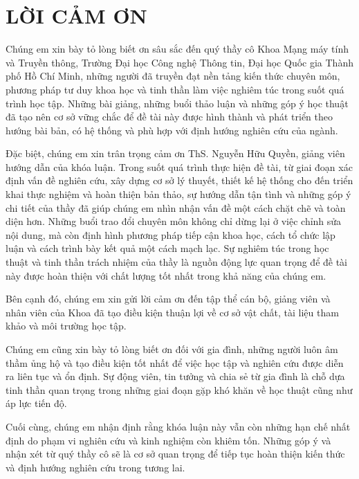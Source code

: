 \documentclass[12pt, oneside]{thesis}
\begin{document}
\frontmatter\pagestyle{plain}





\chapter*{LỜI CẢM ƠN}

Chúng em xin bày tỏ lòng biết ơn sâu sắc đến quý thầy cô Khoa Mạng máy tính và Truyền thông, Trường Đại học Công nghệ Thông tin, Đại học Quốc gia Thành phố Hồ Chí Minh, những người đã truyền đạt nền tảng kiến thức chuyên môn, phương pháp tư duy khoa học và tinh thần làm việc nghiêm túc trong suốt quá trình học tập. Những bài giảng, những buổi thảo luận và những góp ý học thuật đã tạo nên cơ sở vững chắc để đề tài này được hình thành và phát triển theo hướng bài bản, có hệ thống và phù hợp với định hướng nghiên cứu của ngành.

Đặc biệt, chúng em xin trân trọng cảm ơn ThS. Nguyễn Hữu Quyền, giảng viên hướng dẫn của khóa luận. Trong suốt quá trình thực hiện đề tài, từ giai đoạn xác định vấn đề nghiên cứu, xây dựng cơ sở lý thuyết, thiết kế hệ thống cho đến triển khai thực nghiệm và hoàn thiện bản thảo, sự hướng dẫn tận tình và những góp ý chi tiết của thầy đã giúp chúng em nhìn nhận vấn đề một cách chặt chẽ và toàn diện hơn. Những buổi trao đổi chuyên môn không chỉ dừng lại ở việc chỉnh sửa nội dung, mà còn định hình phương pháp tiếp cận khoa học, cách tổ chức lập luận và cách trình bày kết quả một cách mạch lạc. Sự nghiêm túc trong học thuật và tinh thần trách nhiệm của thầy là nguồn động lực quan trọng để đề tài này được hoàn thiện với chất lượng tốt nhất trong khả năng của chúng em.

Bên cạnh đó, chúng em xin gửi lời cảm ơn đến tập thể cán bộ, giảng viên và nhân viên của Khoa đã tạo điều kiện thuận lợi về cơ sở vật chất, tài liệu tham khảo và môi trường học tập.

Chúng em cũng xin bày tỏ lòng biết ơn đối với gia đình, những người luôn âm thầm ủng hộ và tạo điều kiện tốt nhất để việc học tập và nghiên cứu được diễn ra liên tục và ổn định. Sự động viên, tin tưởng và chia sẻ từ gia đình là chỗ dựa tinh thần quan trọng trong những giai đoạn gặp khó khăn về học thuật cũng như áp lực tiến độ.

Cuối cùng, chúng em nhận định rằng khóa luận này vẫn còn những hạn chế nhất định do phạm vi nghiên cứu và kinh nghiệm còn khiêm tốn. Những góp ý và nhận xét từ quý thầy cô sẽ là cơ sở quan trọng để tiếp tục hoàn thiện kiến thức và định hướng nghiên cứu trong tương lai.
\end{document}
